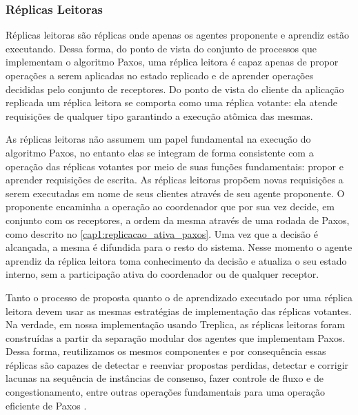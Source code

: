\subsubsection{Réplicas Leitoras}

Réplicas leitoras são réplicas onde apenas os agentes proponente e aprendiz estão
executando. Dessa forma, do ponto de vista do conjunto de processos que implementam o
algoritmo Paxos, uma réplica leitora é capaz apenas de propor operações a serem aplicadas
no estado replicado e de aprender operações decididas pelo conjunto de receptores. Do
ponto de vista do cliente da aplicação replicada um réplica leitora se comporta como uma
réplica votante: ela atende requisições de qualquer tipo garantindo a execução atômica das
mesmas.

As réplicas leitoras não assumem um papel fundamental na execução do algoritmo Paxos, no
entanto elas se integram de forma consistente com a operação das réplicas votantes por
meio de suas funções fundamentais: propor e aprender requisições de escrita. As réplicas
leitoras propõem novas requisições a serem executadas em nome de seus clientes através de
seu agente proponente. O proponente encaminha a operação ao coordenador que por sua vez
decide, em conjunto com os receptores, a ordem da mesma através de uma rodada de Paxos,
como descrito no \autoref{cap1:replicacao_ativa_paxos}. Uma vez que a decisão é alcançada,
a mesma é difundida para o resto do sistema. Nesse momento o agente aprendiz da réplica
leitora toma conhecimento da decisão e atualiza o seu estado interno, sem a participação
ativa do coordenador ou de qualquer receptor.

Tanto o processo de proposta quanto o de aprendizado executado por uma réplica leitora
devem usar as mesmas estratégias de implementação das réplicas votantes. Na verdade, em
nossa implementação usando Treplica, as réplicas leitoras foram construídas a partir da
separação modular dos agentes que implementam Paxos. Dessa forma, reutilizamos os mesmos
componentes e por consequência essas réplicas são capazes de detectar e reenviar propostas
perdidas, detectar e corrigir lacunas na sequência de instâncias de consenso, fazer
controle de fluxo e de congestionamento, entre outras operações fundamentais para uma
operação eficiente de Paxos \cite{vieira-tr10b}.

